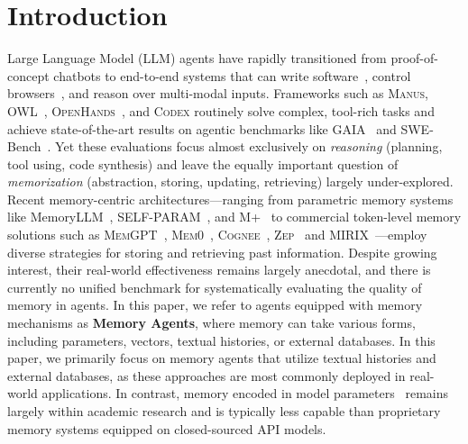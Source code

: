 \section{Introduction}
\label{sec:introduction}
Large Language Model (LLM) agents have rapidly transitioned from proof-of-concept chatbots to end-to-end systems that can write software~\citep{openhands2024}, control browsers~\citep{browser_use2024}, and reason over multi-modal inputs. Frameworks such as \textsc{Manus}, \textsc{OWL}~\citep{owl2025}, \textsc{OpenHands}~\citep{openhands2024}, and \textsc{Codex} routinely solve complex, tool-rich tasks and achieve state-of-the-art results on agentic benchmarks like GAIA~\citep{gaia} and SWE-Bench~\citep{swebench}. Yet these evaluations focus almost exclusively on \emph{reasoning}  (planning, tool using, code synthesis) and leave the equally important question of \emph{memorization} (abstraction, storing, updating, retrieving) largely under-explored. Recent memory-centric architectures—ranging from parametric memory systems like MemoryLLM~\citep{memoryllm}, SELF-PARAM~\citep{self-param}, and M+~\citep{m+} to commercial token-level memory solutions such as \textsc{MemGPT}~\citep{MemGPT,sleep-time-compute}, \textsc{Mem0}~\citep{Mem0}, \textsc{Cognee}~\citep{cognee}, \textsc{Zep}~\citep{Zep} and \textsc{MIRIX}~\citep{mirix}—employ diverse strategies for storing and retrieving past information. Despite growing interest, their real-world effectiveness remains largely anecdotal, and there is currently no unified benchmark for systematically evaluating the quality of memory in agents. In this paper, we refer to agents equipped with memory mechanisms as \textbf{Memory Agents}, where memory can take various forms, including parameters, vectors, textual histories, or external databases. In this paper, we primarily focus on memory agents that utilize textual histories and external databases, as these approaches are most commonly deployed in real-world applications. In contrast, memory encoded in model parameters~\citep{memoryllm,m+,yin2024explicit} remains largely within academic research and is typically less capable than proprietary memory systems equipped on closed-sourced API models.


